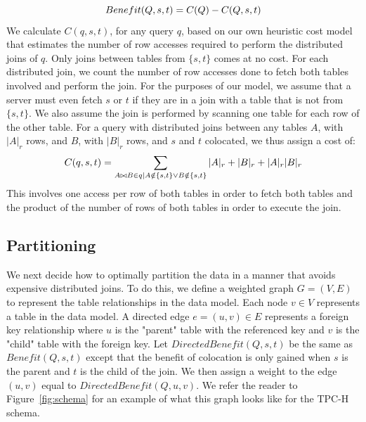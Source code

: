 \begin{equation}
Benefit(Q,s,t) = C(Q) - C(Q,s,t)
\vspace*{-8pt}
\end{equation}
We calculate $C(q,s,t)$, for any query $q$, based on our own heuristic cost model that estimates the number of row accesses required to perform the distributed joins of $q$. Only joins between tables from $\{s,t\}$ comes at no cost.  For each distributed join, we count the number of row accesses done to fetch both tables involved and perform the join.  For the purposes of our model, we assume that a server must even fetch $s$ or $t$ if they are in a join with a table that is not from $\{s,t\}$.  We also assume the join is performed by scanning one table for each row of the other table.  For a query with distributed joins between any tables $A$, with $|A|_r$ rows, and $B$, with $|B|_r$ rows, and $s$ and $t$ colocated, we thus assign a cost of:
\vspace*{-4pt}
\begin{equation}
\label{eq:cost}
C(q,s,t) = \sum_{A\bowtie B\in q\mid A\notin \{s,t\} \lor B\notin\{s,t\}}|A|_r + |B|_r + |A|_r|B|_r
\vspace*{-4pt}
\end{equation}
\noindent This involves one access per row of both tables in order to fetch both tables and the product of the number of rows of both tables in order to execute the join.

\subsection{Partitioning}
We next decide how to optimally partition the data in a manner that avoids expensive distributed joins.  To do this, we define a weighted graph $G = (V,E)$ to represent the table relationships in the data model. Each node $v \in V$ represents a table in the data model. A directed edge $e = (u,v) \in E$ represents a foreign key relationship where $u$ is the "parent" table with the referenced key and $v$ is the "child" table with the foreign key. 
Let $DirectedBenefit(Q,s,t)$ be the same as $Benefit(Q,s,t)$ except that the benefit of colocation is only gained when $s$ is the parent and $t$ is the child of the join.  We then assign a weight to the edge $(u,v)$ equal to $DirectedBenefit(Q,u,v)$.  We refer the reader to Figure~\ref{fig:schema} for an example of what this graph looks like for the TPC-H schema.

